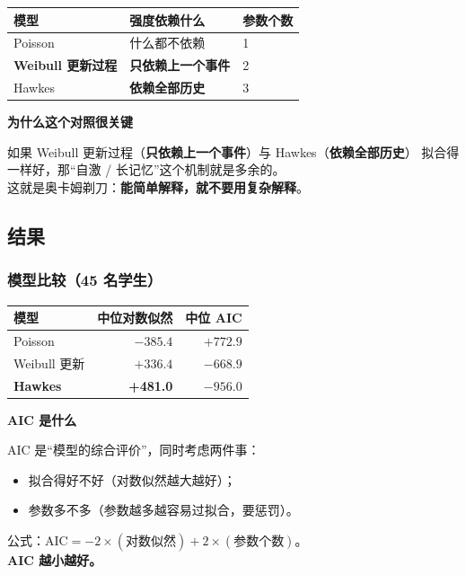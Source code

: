 \documentclass[UTF8,a4paper,11pt]{ctexart}
\newenvironment{explainbox}[1]
{\begin{center}\begin{minipage}{0.94\textwidth}\colorbox{boxbg}{\parbox{0.92\textwidth}{\textbf{#1}\par\vspace{2pt}}}}
{\end{minipage}\end{center}}
\begin{document}
\begin{longtable}{@{}p{3.6cm}p{4.4cm}p{5.8cm}@{}}
\toprule
\textbf{模型} & \textbf{强度依赖什么} & \textbf{参数个数} \\
\midrule
Poisson & 什么都不依赖 & 1 \\
\textbf{Weibull 更新过程} & \textbf{只依赖上一个事件} & 2 \\
Hawkes & \textbf{依赖全部历史} & 3 \\
\bottomrule
\end{longtable}

\begin{explainbox}{为什么这个对照很关键}
如果 Weibull 更新过程（\textbf{只依赖上一个事件}）与 Hawkes（\textbf{依赖全部历史}）
拟合得一样好，那“自激 / 长记忆”这个机制就是多余的。\\
这就是奥卡姆剃刀：\textbf{能简单解释，就不要用复杂解释}。
\end{explainbox}

\subsection{结果}

\subsubsection{模型比较（45 名学生）}

\begin{center}
\begin{tabular}{p{4.6cm}rr}
\toprule
\textbf{模型} & \textbf{中位对数似然} & \textbf{中位 AIC} \\
\midrule
Poisson & $-385.4$ & $+772.9$ \\
Weibull 更新 & $+336.4$ & $-668.9$ \\
\textbf{Hawkes} & \textbf{+481.0} & \textbf{$-956.0$} \\
\bottomrule
\end{tabular}
\end{center}

\begin{explainbox}{AIC 是什么}
AIC 是“模型的综合评价”，同时考虑两件事：
\begin{itemize}[leftmargin=1.4em,itemsep=1pt]
\item 拟合得好不好（对数似然越大越好）；
\item 参数多不多（参数越多越容易过拟合，要惩罚）。
\end{itemize}
公式：$\text{AIC} = -2\times(\text{对数似然}) + 2\times(\text{参数个数})$。\\
\textbf{AIC 越小越好。}
\end{explainbox}
\end{document}
